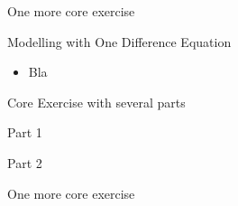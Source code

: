 \question
	One more core exercise






%
%



\begin{module}{Modelling with One Difference Equation}
	\label{diff:model}

	
	
\end{module}



\begin{lesson}

	\begin{itemize}
		\item Bla
	\end{itemize}
	

\end{lesson}


\newpage

\question
	Core Exercise with several parts
\begin{parts}
	\item Part 1
	\item Part 2
\end{parts}

\bookonlynewpage


\question
	One more core exercise


%
%
%
%
%
%
%
%	
%	
%
%
%
%
%	
%
%
%
%
%
%
%
%
%





